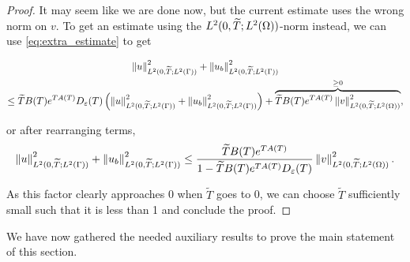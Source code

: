 \begin{proof}
    \noindent
    It may seem like we are done now, but the current estimate uses the wrong norm on $v$. To get an estimate using the $L^2(0, \widetilde{T}; L^2(\Omega))$-norm instead, we can use \cref{eq:extra_estimate} to get

    \begin{multline}
        \left\| u \right\|_{L^2(0, \widetilde{T}; L^2(\Gamma))}^2 + \left\| u_b \right\|_{L^2(0, \widetilde{T}; L^2(\Gamma))}^2 \\
        \leq \widetilde{T} B(T) e^{T A(T)} D_\varepsilon(T) \left(\left\| u \right\|_{L^2(0, \widetilde{T}; L^2(\Gamma))}^2 + \left\| u_b \right\|_{L^2(0, \widetilde{T}; L^2(\Gamma))}^2\right) + \overbrace{\widetilde{T} B(T) e^{T A(T)} \left\| v \right\|_{L^2(0, \widetilde{T}; L^2(\Omega))}^2}^{\geq 0},
    \end{multline}

    \noindent
    or after rearranging terms,
%
    \begin{equation*}
    \begin{aligned}
        \left\| u \right\|_{L^2(0, \widetilde{T}; L^2(\Gamma))}^2 + \left\| u_b \right\|_{L^2(0, \widetilde{T}; L^2(\Gamma))}^2 \leq \frac{\widetilde{T} B(T) e^{T A(T)}}{1 - \widetilde{T} B(T) e^{T A(T)} D_\varepsilon(T)} \left\| v \right\|_{L^2(0, \widetilde{T}; L^2(\Omega))}^2.
    \end{aligned}
    \end{equation*}

    \noindent
    As this factor clearly approaches 0 when $\widetilde{T}$ goes to 0, we can choose $\widetilde{T}$ sufficiently small such that it is less than 1 and conclude the proof.
\end{proof}

We have now gathered the needed auxiliary results to prove the main statement of this section.

